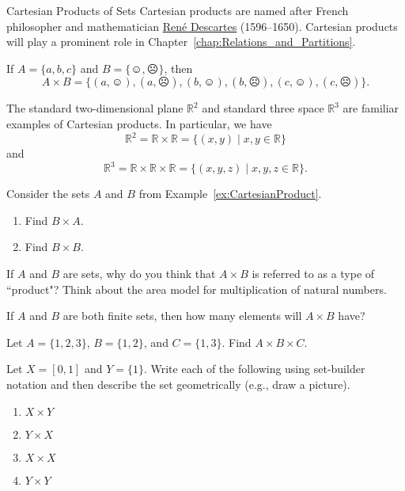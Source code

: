 \begin{section}{Cartesian Products of Sets}
Cartesian products are named after French philosopher and mathematician \href{https://en.wikipedia.org/wiki/Rene_Descartes}{Ren\'e Descartes} (1596--1650). Cartesian products will play a prominent role in Chapter~\ref{chap:Relations_and_Partitions}.

\begin{example}\label{ex:CartesianProduct}
If $A=\{a,b,c\}$ and $B=\{\smiley,\frownie\}$, then 
\[
A\times B=\{(a,\smiley), (a,\frownie),(b,\smiley),(b,\frownie), (c,\smiley),(c,\frownie)\}.
\]
\end{example}

\begin{example}
The standard two-dimensional plane $\mathbb{R}^2$ and standard three space $\mathbb{R}^{3}$ are familiar examples of Cartesian products.  In particular, we have
\[
\mathbb{R}^2=\mathbb{R}\times \mathbb{R}=\{(x,y)\mid x,y\in \mathbb{R}\}
\]
and
\[
\mathbb{R}^3=\mathbb{R}\times \mathbb{R}\times \mathbb{R}=\{(x,y,z)\mid x,y,z\in \mathbb{R}\}.
\]
\end{example}

\begin{problem}
Consider the sets $A$ and $B$ from Example~\ref{ex:CartesianProduct}.
\begin{enumerate}[label=\textrm{(\alph*)}]
\item Find $B\times A$. 
\item Find $B\times B$.
\end{enumerate}
\end{problem}

\begin{problem}
If $A$ and $B$ are sets, why do you think that $A\times B$ is referred to as a type of ``product"? Think about the area model for multiplication of natural numbers.
\end{problem}

\begin{problem}
If $A$ and $B$ are both finite sets, then how many elements will $A\times B$ have?
\end{problem}

\begin{problem} 
Let $A=\{1, 2, 3\}$, $B=\{1,2\}$, and $C=\{1,3\}$. Find $A \times B\times C$. 
\end{problem}

\begin{problem}
Let $X=[0,1]$ and $Y=\{1\}$.  Write each of the following using set-builder notation and then describe the set geometrically (e.g., draw a picture). 
\begin{enumerate}[label=\textrm{(\alph*)}]
\item $X\times Y$
\item $Y\times X$
\item $X\times X$
\item $Y\times Y$
\end{enumerate}
\end{problem}


\end{section}

